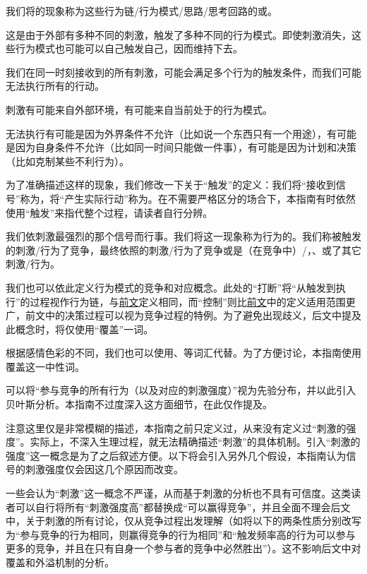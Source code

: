 我们将的现象称为这些行为链/行为模式/思路/思考回路的或。
\begin{explain}
这是由于外部有多种不同的刺激，触发了多种不同的行为模式。即使刺激消失，这些行为模式也可能可以自己触发自己，因而维持下去。
\end{explain}
\label{para:行动}我们在同一时刻接收到的所有刺激，可能会满足多个行为的触发条件，而我们可能无法执行所有的行动。
\begin{explain}
刺激有可能来自外部环境，有可能来自当前处于的行为模式。

无法执行有可能是因为外界条件不允许（比如说一个东西只有一个用途），有可能是因为自身条件不允许（比如同一时间只能做一件事），有可能是因为计划和决策（比如克制某些不利行为）。

为了准确描述这样的现象，我们修改一下关于“触发”的定义：我们将“接收到信号”称为，将“产生实际行动”称为。在不需要严格区分的场合下，本指南有时依然使用“触发”来指代整个过程，请读者自行分辨。
\end{explain}
我们依刺激最强烈的那个信号而行事。我们将这一现象称为行为的。我们称被触发的刺激/行为了竞争，最终依照的刺激/行为了竞争或是（在竞争中）/，、或了其它刺激/行为。
\begin{explain}
我们也可以依此定义行为模式的竞争和对应概念。此处的“打断”将“从触发到执行”的过程视作行为链，与\hyperref[def:打断]{前文}定义相同，而“控制”则比\hyperref[def:控制]{前文}中的定义适用范围更广，前文中的决策过程可以视为竞争过程的特例。为了避免出现歧义，后文中提及此概念时，将仅使用“覆盖”一词。

根据感情色彩的不同，我们也可以使用、等词汇代替。为了方便讨论，本指南使用覆盖这一中性词。

\trained 可以将“参与竞争的所有行为（以及对应的刺激强度）”视为先验分布，并以此引入贝叶斯分析。本指南不过度深入这方面细节，在此仅作提及。

注意这里仅是非常模糊的描述，本指南之前只定义过，从来没有定义过“刺激的强度”。实际上，不深入生理过程，就无法精确描述“刺激”的具体机制。引入“刺激的强度”这一概念是为了之后叙述方便。以下将会引入另外几个假设，本指南认为信号的刺激强度仅会因这几个原因而改变。

一些\rigorous 会认为“刺激”这一概念不严谨，从而基于刺激的分析也不具有可信度。这类读者可以自行将所有“刺激强度高”都替换成“可以赢得竞争”，并且全面不理会后文中，关于刺激的所有讨论，仅从竞争过程出发理解（如将以下的两条性质分别改写为“参与竞争的行为相同，则赢得竞争的行为相同”和“触发频率高的行为可以参与更多的竞争，并且在只有自身一个参与者的竞争中必然胜出”）。这不影响后文中对覆盖和外溢机制的分析。
\end{explain}
